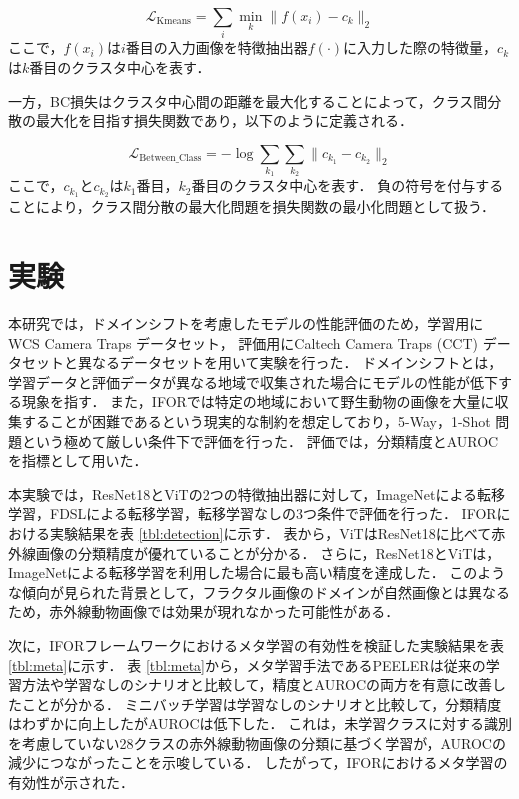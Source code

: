 \documentclass[uplatex,dvipdfmx,10pt,twocolumn]{jsarticle}
\begin{document}
\begin{equation}
  \mathcal{L}_{\mathrm{Kmeans}} = \sum_i{\min_k \lVert f(x_i)-c_k \rVert_2}
\end{equation}
ここで，$f(x_i)$は$i$番目の入力画像を特徴抽出器$f(\cdot)$に入力した際の特徴量，$c_k$は$k$番目のクラスタ中心を表す．

一方，BC損失はクラスタ中心間の距離を最大化することによって，クラス間分散の最大化を目指す損失関数であり，以下のように定義される．

\begin{equation}
  \mathcal{L}_{\mathrm{Between\_Class}} = -\log{\sum_{k_1}{\sum_{k_2}{\lVert c_{k_1} - c_{k_2} \rVert_2}}}
\end{equation}
ここで，$c_{k_1}$と$c_{k_2}$は$k_1$番目，$k_2$番目のクラスタ中心を表す．
負の符号を付与することにより，クラス間分散の最大化問題を損失関数の最小化問題として扱う．

\section{実験}

本研究では，ドメインシフトを考慮したモデルの性能評価のため，学習用にWCS Camera Traps データセット，
評価用にCaltech Camera Traps (CCT) データセットと異なるデータセットを用いて実験を行った．
ドメインシフトとは，学習データと評価データが異なる地域で収集された場合にモデルの性能が低下する現象を指す．
また，IFORでは特定の地域において野生動物の画像を大量に収集することが困難であるという現実的な制約を想定しており，5-Way，1-Shot 問題という極めて厳しい条件下で評価を行った．
評価では，分類精度とAUROCを指標として用いた．

本実験では，ResNet18とViTの2つの特徴抽出器に対して，ImageNetによる転移学習，FDSLによる転移学習，転移学習なしの3つ条件で評価を行った．
IFORにおける実験結果を表 \ref{tbl:detection}に示す．
表から，ViTはResNet18に比べて赤外線画像の分類精度が優れていることが分かる．
さらに，ResNet18とViTは，ImageNetによる転移学習を利用した場合に最も高い精度を達成した．
このような傾向が見られた背景として，フラクタル画像のドメインが自然画像とは異なるため，赤外線動物画像では効果が現れなかった可能性がある．

次に，IFORフレームワークにおけるメタ学習の有効性を検証した実験結果を表 \ref{tbl:meta}に示す．
表 \ref{tbl:meta}から，メタ学習手法であるPEELERは従来の学習方法や学習なしのシナリオと比較して，精度とAUROCの両方を有意に改善したことが分かる．
ミニバッチ学習は学習なしのシナリオと比較して，分類精度はわずかに向上したがAUROCは低下した．
これは，未学習クラスに対する識別を考慮していない28クラスの赤外線動物画像の分類に基づく学習が，AUROCの減少につながったことを示唆している．
したがって，IFORにおけるメタ学習の有効性が示された．
\end{document}
